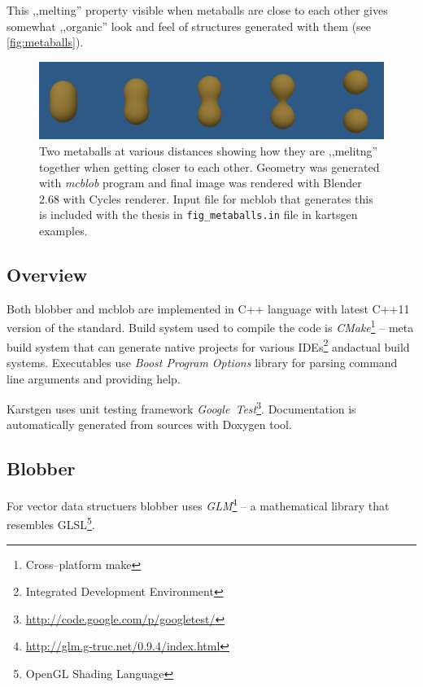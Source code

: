 This ,,melting'' property visible when metaballs are close to each other gives
somewhat ,,organic'' look and feel of structures generated with them
(see \autoref{fig:metaballs}).
\label{sub:metaballs}
\begin{figure}[htb]
  \begin{center}
    \includegraphics[width=\textwidth]{chapters/project/metaballs.png}
  \end{center}
  \caption{Two metaballs at various distances showing how they are ,,melitng''
    together when getting closer to each other. Geometry was generated with
    \emph{mcblob} program and final image was rendered with Blender 2.68 with
    Cycles renderer. Input file for mcblob that generates this is included with the thesis
      in \texttt{fig\_metaballs.in} file in kartsgen examples.
  }
  \label{fig:metaballs}
\end{figure}


\subsection{Overview}
Both blobber and mcblob are implemented in C++ language with latest C++11
version of the standard. Build system used to compile the code is \emph{CMake}\footnote{Cross--platform make}
-- meta build system that can generate native projects for various IDEs\footnote{Integrated Development Environment}
andactual build systems. Executables use \emph{Boost Program Options} library
for parsing command line arguments and providing help.

Karstgen uses unit testing framework \emph{Google~Test}\footnote{\url{http://code.google.com/p/googletest/}}.
Documentation is automatically generated from sources with Doxygen
tool.


\subsection{Blobber}

For vector data structuers blobber uses \emph{GLM}\footnote{\url{http://glm.g-truc.net/0.9.4/index.html}}
-- a mathematical library that resembles GLSL\footnote{OpenGL Shading Language}.

